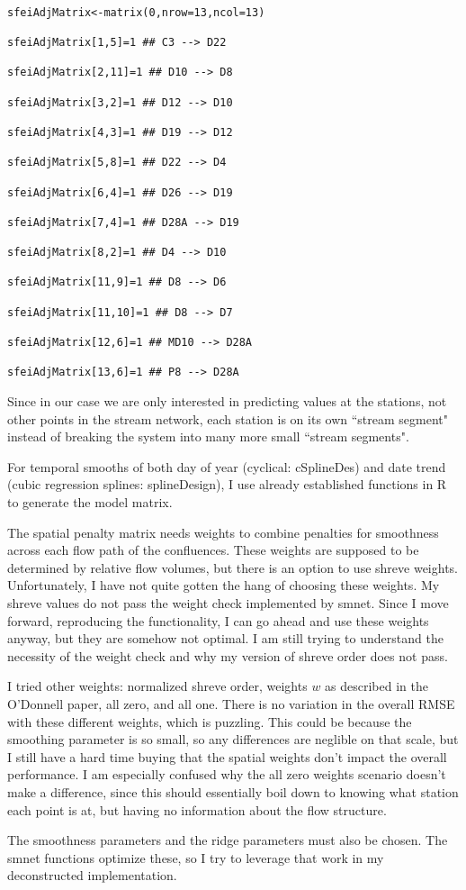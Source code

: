 \documentclass[12pt]{amsart}
\begin{document}
\begin{verbatim}

sfeiAdjMatrix<-matrix(0,nrow=13,ncol=13)

sfeiAdjMatrix[1,5]=1 ## C3 --> D22

sfeiAdjMatrix[2,11]=1 ## D10 --> D8

sfeiAdjMatrix[3,2]=1 ## D12 --> D10

sfeiAdjMatrix[4,3]=1 ## D19 --> D12

sfeiAdjMatrix[5,8]=1 ## D22 --> D4

sfeiAdjMatrix[6,4]=1 ## D26 --> D19

sfeiAdjMatrix[7,4]=1 ## D28A --> D19

sfeiAdjMatrix[8,2]=1 ## D4 --> D10

sfeiAdjMatrix[11,9]=1 ## D8 --> D6

sfeiAdjMatrix[11,10]=1 ## D8 --> D7

sfeiAdjMatrix[12,6]=1 ## MD10 --> D28A

sfeiAdjMatrix[13,6]=1 ## P8 --> D28A
\end{verbatim}

Since in our case we are only interested in predicting values at the stations, not other points in the stream network, each station is on its own ``stream segment" instead of breaking the system into many more small ``stream segments". 

For temporal smooths of both day of year (cyclical: cSplineDes) and date trend (cubic regression splines: splineDesign), I use already established functions in R to generate the model matrix.

The spatial penalty matrix needs weights to combine penalties for smoothness across each flow path of the confluences. These weights are supposed to be determined by relative flow volumes, but there is an option to use shreve weights. Unfortunately, I have not quite gotten the hang of choosing these weights. My shreve values do not pass the weight check implemented by smnet. Since I move forward, reproducing the functionality, I can go ahead and use these weights anyway, but they are somehow not optimal. I am still trying to understand the necessity of the weight check and why my version of shreve order does not pass.

I tried other weights: normalized shreve order, weights $w$ as described in the O'Donnell paper, all zero, and all one. There is no variation in the overall RMSE with these different weights, which is puzzling. This could be because the smoothing parameter is so small, so any differences are neglible on that scale, but I still have a hard time buying that the spatial weights don't impact the overall performance. I am especially confused why the all zero weights scenario doesn't make a difference, since this should essentially boil down to knowing what station each point is at, but having no information about the flow structure.

The smoothness parameters and the ridge parameters must also be chosen. The smnet functions optimize these, so I try to leverage that work in my deconstructed implementation. 







\textbf{}
\end{document}
